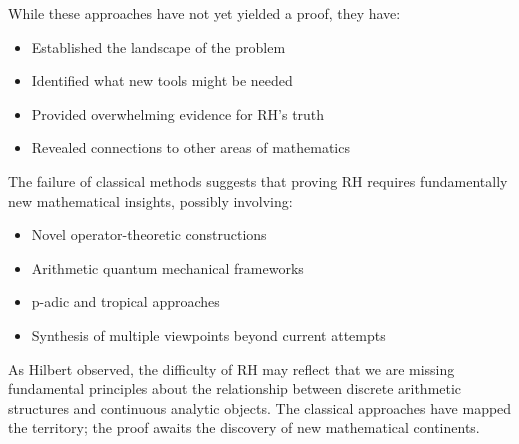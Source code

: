 While these approaches have not yet yielded a proof, they have:
\begin{itemize}
\item Established the landscape of the problem
\item Identified what new tools might be needed
\item Provided overwhelming evidence for RH's truth
\item Revealed connections to other areas of mathematics
\end{itemize}

The failure of classical methods suggests that proving RH requires fundamentally new mathematical insights, possibly involving:
\begin{itemize}
\item Novel operator-theoretic constructions
\item Arithmetic quantum mechanical frameworks  
\item p-adic and tropical approaches
\item Synthesis of multiple viewpoints beyond current attempts
\end{itemize}

As Hilbert observed, the difficulty of RH may reflect that we are missing fundamental principles about the relationship between discrete arithmetic structures and continuous analytic objects. The classical approaches have mapped the territory; the proof awaits the discovery of new mathematical continents.